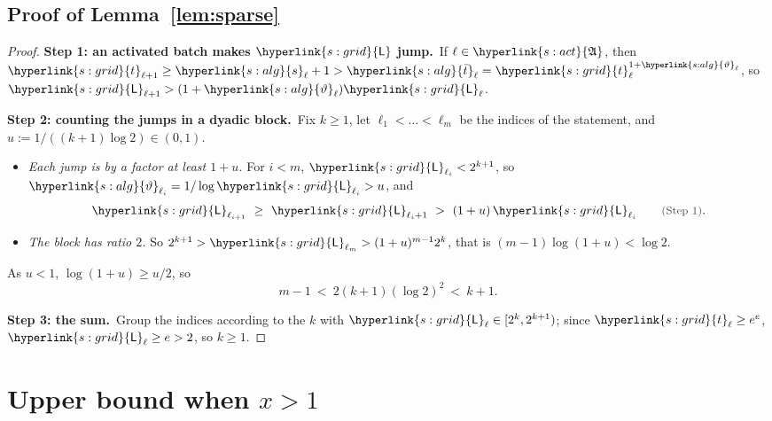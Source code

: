 \documentclass[10pt]{article}
\newcommand{\sy}[2]{{\hyperlink{#1}{#2}}}
\newcommand{\1}{\mathbf{1}}
\newcommand{\tl}{\sy{s:grid}{t}}
\newcommand{\Lg}{\sy{s:grid}{\mathsf L}}
\newcommand{\tauA}{\sy{s:alg}{\bar t}}
\newcommand{\sA}{\sy{s:alg}{s}}
\newcommand{\thv}{\sy{s:alg}{\vartheta}}
\newcommand{\Act}{\sy{s:act}{\mathfrak A}}
\newcommand{\stp}[2]{\par\medskip\noindent\textbf{Step #1: #2.}\ }
\newcommand{\why}[1]{\text{\small\color{black!70}(#1)}}
\begin{document}
\subsection{Proof of Lemma~\ref{lem:sparse}}\label{sec:pf-lem:sparse}
\begin{proof}
\stp1{an activated batch makes $\Lg$ jump}If $\ell\in\Act$, then $\tl_{\ell+1}\ge\sA_\ell+1>\tauA_\ell=\tl_\ell^{1+\thv_\ell}$, so $\Lg_{\ell+1}>(1+\thv_\ell)\Lg_\ell$.

\stp2{counting the jumps in a dyadic block}Fix $k\ge1$, let $\ell_1<\dots<\ell_m$ be the indices of the statement, and $u:=1/((k+1)\log2)\in(0,1)$.
\begin{itemize}
\item \emph{Each jump is by a factor at least $1+u$.} For $i<m$, $\Lg_{\ell_i}<2^{k+1}$, so $\thv_{\ell_i}=1/\log\Lg_{\ell_i}>u$, and
\[
\Lg_{\ell_{i+1}}\ \ge\ \Lg_{\ell_i+1}\ >\ (1+u)\,\Lg_{\ell_i}\qquad\why{Step~1}.
\]
\item \emph{The block has ratio $2$.} So $2^{k+1}>\Lg_{\ell_m}>(1+u)^{m-1}2^k$, that is $(m-1)\log(1+u)<\log2$.
\end{itemize}
As $u<1$, $\log(1+u)\ge u/2$, so
\[
m-1\ <\ 2(k+1)(\log2)^2\ <\ k+1 .
\]

\stp3{the sum}Group the indices according to the $k$ with $\Lg_\ell\in[2^k,2^{k+1})$; since $\tl_\ell\ge e^e$, $\Lg_\ell\ge e>2$, so $k\ge1$.
\end{proof}

\section{Upper bound when \texorpdfstring{$x>1$}{x>1}}\label{sec:app-xsup}
\end{document}
